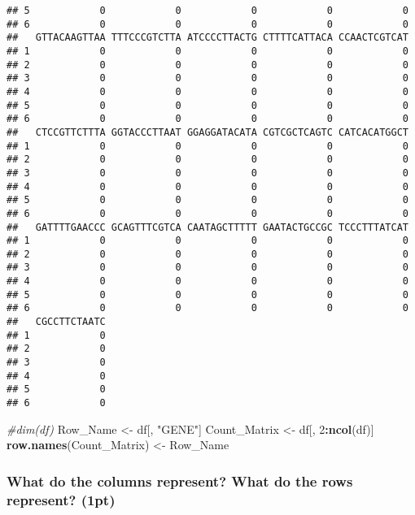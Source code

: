 \documentclass[]{article}
\newenvironment{Shaded}{\begin{snugshade}}{\end{snugshade}}
\newcommand{\KeywordTok}[1]{\textcolor[rgb]{0.13,0.29,0.53}{\textbf{#1}}}
\newcommand{\DecValTok}[1]{\textcolor[rgb]{0.00,0.00,0.81}{#1}}
\newcommand{\StringTok}[1]{\textcolor[rgb]{0.31,0.60,0.02}{#1}}
\newcommand{\CommentTok}[1]{\textcolor[rgb]{0.56,0.35,0.01}{\textit{#1}}}
\newcommand{\OperatorTok}[1]{\textcolor[rgb]{0.81,0.36,0.00}{\textbf{#1}}}
\newcommand{\NormalTok}[1]{#1}
\begin{document}
\begin{verbatim}
## 5            0            0            0            0            0
## 6            0            0            0            0            0
##   GTTACAAGTTAA TTTCCCGTCTTA ATCCCCTTACTG CTTTTCATTACA CCAACTCGTCAT
## 1            0            0            0            0            0
## 2            0            0            0            0            0
## 3            0            0            0            0            0
## 4            0            0            0            0            0
## 5            0            0            0            0            0
## 6            0            0            0            0            0
##   CTCCGTTCTTTA GGTACCCTTAAT GGAGGATACATA CGTCGCTCAGTC CATCACATGGCT
## 1            0            0            0            0            0
## 2            0            0            0            0            0
## 3            0            0            0            0            0
## 4            0            0            0            0            0
## 5            0            0            0            0            0
## 6            0            0            0            0            0
##   GATTTTGAACCC GCAGTTTCGTCA CAATAGCTTTTT GAATACTGCCGC TCCCTTTATCAT
## 1            0            0            0            0            0
## 2            0            0            0            0            0
## 3            0            0            0            0            0
## 4            0            0            0            0            0
## 5            0            0            0            0            0
## 6            0            0            0            0            0
##   CGCCTTCTAATC
## 1            0
## 2            0
## 3            0
## 4            0
## 5            0
## 6            0
\end{verbatim}

\begin{Shaded}
\begin{Highlighting}[]
\CommentTok{#dim(df)}
\NormalTok{Row_Name <-}\StringTok{ }\NormalTok{df[, }\StringTok{"GENE"}\NormalTok{]}
\NormalTok{Count_Matrix <-}\StringTok{ }\NormalTok{df[, }\DecValTok{2}\OperatorTok{:}\KeywordTok{ncol}\NormalTok{(df)]}
\KeywordTok{row.names}\NormalTok{(Count_Matrix) <-}\StringTok{ }\NormalTok{Row_Name}
\end{Highlighting}
\end{Shaded}

\subsubsection{What do the columns represent? What do the rows
represent?
(1pt)}\label{what-do-the-columns-represent-what-do-the-rows-represent-1pt}
\end{document}
